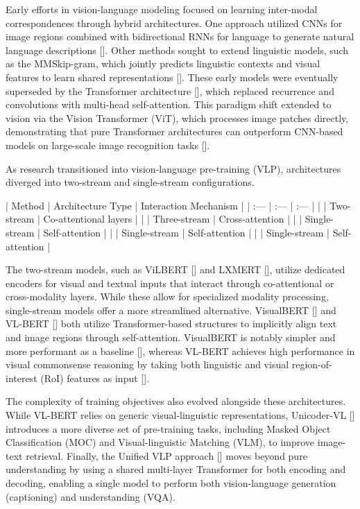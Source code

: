 \documentclass[11pt]{article}
\begin{document}
Early efforts in vision-language modeling focused on learning inter-modal correspondences through hybrid architectures. One approach utilized CNNs for image regions combined with bidirectional RNNs for language to generate natural language descriptions [\citep{1412.2306}]. Other methods sought to extend linguistic models, such as the MMSkip-gram, which jointly predicts linguistic contexts and visual features to learn shared representations [\citep{1501.02598}]. These early models were eventually superseded by the Transformer architecture [\citep{1706.03762}], which replaced recurrence and convolutions with multi-head self-attention. This paradigm shift extended to vision via the Vision Transformer (ViT), which processes image patches directly, demonstrating that pure Transformer architectures can outperform CNN-based models on large-scale image recognition tasks [\citep{2010.11929}].

As research transitioned into vision-language pre-training (VLP), architectures diverged into two-stream and single-stream configurations.

| Method | Architecture Type | Interaction Mechanism |
| :--- | :--- | :--- |
| \citep{1908.02265} | Two-stream | Co-attentional layers |
| \citep{1908.07490} | Three-stream | Cross-attention |
| \citep{1908.03557} | Single-stream | Self-attention |
| \citep{1908.08530} | Single-stream | Self-attention |
| \citep{1908.06066} | Single-stream | Self-attention |

The two-stream models, such as ViLBERT [\citep{1908.02265}] and LXMERT [\citep{1908.07490}], utilize dedicated encoders for visual and textual inputs that interact through co-attentional or cross-modality layers. While these allow for specialized modality processing, single-stream models offer a more streamlined alternative. VisualBERT [\citep{1908.03557}] and VL-BERT [\citep{1908.08530}] both utilize Transformer-based structures to implicitly align text and image regions through self-attention. VisualBERT is notably simpler and more performant as a baseline [\citep{1908.03557}], whereas VL-BERT achieves high performance in visual commonsense reasoning by taking both linguistic and visual region-of-interest (RoI) features as input [\citep{1908.08530}].

The complexity of training objectives also evolved alongside these architectures. While VL-BERT relies on generic visual-linguistic representations, Unicoder-VL [\citep{1908.06066}] introduces a more diverse set of pre-training tasks, including Masked Object Classification (MOC) and Visual-linguistic Matching (VLM), to improve image-text retrieval. Finally, the Unified VLP approach [\citep{1909.11059}] moves beyond pure understanding by using a shared multi-layer Transformer for both encoding and decoding, enabling a single model to perform both vision-language generation (captioning) and understanding (VQA).
\end{document}
